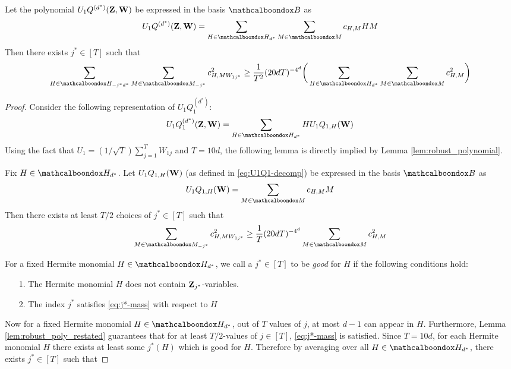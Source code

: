 \begin{lemma}					\label{lem:goodj}
Let the polynomial $U_1Q^{(d^*)}({\bf Z},{\bf W})$ be expressed in the basis $\mcb{B}$ as 
\begin{equation*}
U_1Q^{(d^*)}({\bf Z},{\bf W}) = \sum_{H \in \mcb{H}_{d^*}}\sum_{M \in \mcb{M}} c_{H,M}HM 
\end{equation*}
Then there exists $j^* \in [T]$ such that 
\begin{equation}							\label{eq:goodj-main}
\sum_{H \in \mcb{H}_{-j^*d^*}}\sum_{M \in \mcb{M}_{-j^*}} c^2_{H,MW_{1j^*}} \ge \frac{1}{T^2}(20dT)^{-4^d}\bigg(\sum_{H \in \mcb{H}_{d^*}}\sum_{M \in \mcb{M}} c^2_{H,M}\bigg)
\end{equation}
\end{lemma}
\begin{proof}
Consider the following representation of $U_1Q^{(d^*)}_1$:
\begin{equation}				\label{eq:U1Q1-decomp}
U_1Q^{(d^*)}_1({\bf Z},{\bf W}) = \sum_{H \in \mcb{H}_{d^*}}HU_1Q_{1,H}({\bf W})
\end{equation}
Using the fact that $U_1 = (1/\sqrt{T})\sum_{j=1}^TW_{1j}$ and $T = 10d$, the following lemma is directly implied by Lemma \ref{lem:robust_polynomial}.
\begin{lemma}				\label{lem:robust_poly_restated}
	Fix $H \in \mcb{H}_{d^*}$. Let $U_1Q_{1,H}({\bf W})$ (as defined in   \eqref{eq:U1Q1-decomp}) be expressed in the basis $\mcb{B}$ as 
	\begin{equation*}
	U_1Q_{1,H}({\bf W}) = \sum_{M \in \mcb{M}}c_{H,M}M
	\end{equation*}
	Then there exists at least $T/2$ choices of $j^* \in [T]$ such that  
	\begin{equation}					\label{eq:j*-mass}
	\sum_{M \in \mcb{M}_{-j^*}}c^2_{H,MW_{1j^*}} \ge  \frac{1}{T}(20dT)^{-4^d}\sum_{M \in \mcb{M}}c^2_{H,M}
	\end{equation}
\end{lemma} 
For a fixed Hermite monomial $H \in \mcb{H}_{d^*}$, we call a $j^* \in [T]$ to be \emph{good} for $H$ if the following conditions hold:
\begin{itemize}
\item[1.] The Hermite monomial $H$ does not contain ${\bf Z}_{j^*}$-variables.
\item[2.] The index $j^*$ satisfies   \eqref{eq:j*-mass} with respect to $H$
\end{itemize}
Now for a fixed Hermite monomial $H \in \mcb{H}_{d^*}$, out of $T$ values of $j$, at most $d-1$ can appear in $H$. Furthermore, Lemma \ref{lem:robust_poly_restated} guarantees that for at least $T/2$-values of $j \in [T]$,   \eqref{eq:j*-mass} is satisfied. Since $T = 10d$, for each Hermite monomial $H$ there exists at least some $ j^*(H)$ which is good for $H$. Therefore by averaging over all $H \in \mcb{H}_{d^*}$, there exists $j^* \in [T]$ such that 

\end{proof}
